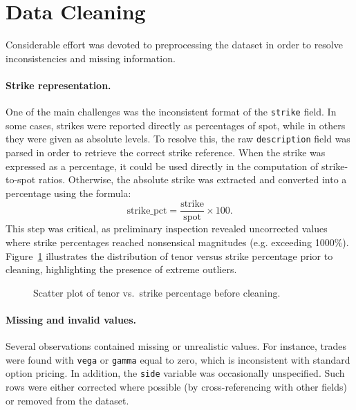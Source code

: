 \documentclass[12pt,a4paper]{report}
\begin{document}
\section{Data Cleaning}

Considerable effort was devoted to preprocessing the dataset in order to resolve inconsistencies and missing information.

\paragraph{Strike representation.}  
One of the main challenges was the inconsistent format of the \texttt{strike} field. In some cases, strikes were reported directly as percentages of spot, while in others they were given as absolute levels. To resolve this, the raw \texttt{description} field was parsed in order to retrieve the correct strike reference. When the strike was expressed as a percentage, it could be used directly in the computation of strike-to-spot ratios. Otherwise, the absolute strike was extracted and converted into a percentage using the formula:
\[
\text{strike\_pct} = \frac{\text{strike}}{\text{spot}} \times 100.
\]
This step was critical, as preliminary inspection revealed uncorrected values where strike percentages reached nonsensical magnitudes (e.g. exceeding 1000\%). Figure~\ref{fig:scatter_before_cleaning} illustrates the distribution of tenor versus strike percentage prior to cleaning, highlighting the presence of extreme outliers. 

\begin{figure}[h]
    \centering
    \fbox{\rule{0pt}{2in}\rule{0.9\linewidth}{0pt}} %
    \caption{Scatter plot of tenor vs.~strike percentage before cleaning.}
    \label{fig:scatter_before_cleaning}
\end{figure}


\paragraph{Missing and invalid values.}  
Several observations contained missing or unrealistic values. For instance, trades were found with \texttt{vega} or \texttt{gamma} equal to zero, which is inconsistent with standard option pricing. In addition, the \texttt{side} variable was occasionally unspecified. Such rows were either corrected where possible (by cross-referencing with other fields) or removed from the dataset.
\end{document}
